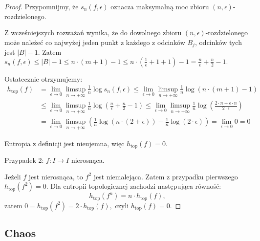 \documentclass[licencjacka]{pwr_wmat_praca_dyplomowa}
\theoremstyle{plain}
\numberwithin{theorem}{chapter}
\theoremstyle{definition}
\numberwithin{theorem}{chapter}
\begin{document}
\begin{proof}
Przypomnijmy, że $s_n(f, \epsilon)$ oznacza maksymalną moc zbioru $(n, \epsilon)$-rozdzielonego. 


Z wcześniejszych rozważań wynika, że do dowolnego zbioru $(n, \epsilon)$-rozdzielonego może należeć co najwyżej jeden punkt z każdego z odcinków $B_j$, odcinków tych jest $|B|-1.$ Zatem $s_n(f, \epsilon) \leq |B|-1 \leq n \cdot (m+1) - 1 \leq n \cdot (\frac{1}{\epsilon}+1+1) - 1 = \frac{n}{\epsilon} + \frac{n}{2} - 1.$



Ostatecznie otrzymujemy:
\begin{equation}
\begin{aligned}
h_{\textrm{top}}(f) & = \lim_{\epsilon \rightarrow 0} \limsup_{n \rightarrow +\infty} \frac{1}{n} \log s_n(f, \epsilon) \leq \lim_{\epsilon \rightarrow 0} \limsup_{n \rightarrow +\infty} \frac{1}{n} \log ( n \cdot (m+1) - 1 ) \\
& \leq \lim_{\epsilon \rightarrow 0} \limsup_{n \rightarrow +\infty} \frac{1}{n} \log ( \frac{n}{\epsilon} + \frac{n}{2} - 1 ) \leq \lim_{\epsilon \rightarrow 0} \limsup_{n \rightarrow +\infty} \frac{1}{n} \log ( \frac{2 \cdot n + \epsilon \cdot n}{2 \cdot \epsilon}) \\
& = \lim_{\epsilon \rightarrow 0} \limsup_{n \rightarrow +\infty} (\frac{1}{n} \log (n \cdot (2 + \epsilon)) - \frac{1}{n} \log ( 2 \cdot \epsilon )) = \lim_{\epsilon \rightarrow 0} 0 = 0
\end{aligned}
\end{equation}

Entropia z definicji jest nieujemna, więc $h_{\textrm{top}}(f) = 0.$

\item[Przypadek 2: $f: I \rightarrow I$ nierosnąca.]

Jeżeli $f$ jest nierosnąca, to $f^2$ jest niemalejąca. Zatem z przypadku pierwszego $h_{\textrm{top}}(f^2) = 0$. Dla entropii topologicznej zachodzi następująca równość: 
$$h_{\textrm{top}}(f^n) = n \cdot h_{\textrm{top}}(f),$$
zatem 
$0 = h_{\textrm{top}}(f^2) = 2 \cdot h_{\textrm{top}}(f),$
czyli
$h_{\textrm{top}}(f) = 0.$

\end{proof}
 
 


\subsection{Chaos}
\end{document}
